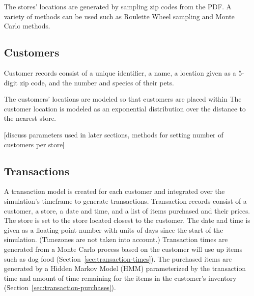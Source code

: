 \documentclass[conference]{IEEEtran}
\begin{document}
The stores' locations are generated by sampling zip codes from the PDF.  A variety of methods can be used such as Roulette Wheel sampling and Monte Carlo methods.

\subsection{Customers}

Customer records consist of a unique identifier, a name, a location given as a 5-digit zip code, and the number and species of their pets.

The customers’ locations are modeled so that customers are placed within  The customer location is modeled as an exponential distribution over the distance to the nearest store.

[discuss parameters used in later sections, methods for setting number of customers per store]

\subsection{Transactions}
A transaction model is created for each customer and integrated over the simulation's timeframe to generate transactions. Transaction records consist of a customer, a store, a date and time, and a list of items purchased and their prices.  The store is set to the store located closest to the customer. The date and time is given as a floating-point number with units of days since the start of the simulation.  (Timezones are not taken into account.)  Transaction times are generated from a Monte Carlo process based on the customer will use up items such as dog food (Section~\ref{sec:transaction-times}).  The purchased items are generated by a Hidden Markov Model (HMM) parameterized by the transaction time and amount of time remaining for the items in the customer's inventory (Section~\ref{sec:transaction-purchases}).
\end{document}
